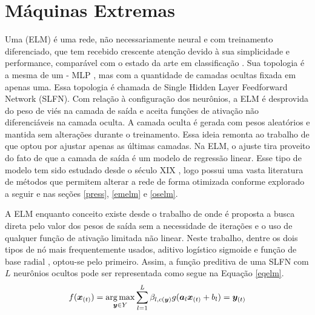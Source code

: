 \section{Máquinas Extremas}\label{elmorig}
Uma  (ELM) é uma rede, não
necessariamente neural e com treinamento diferenciado, que tem recebido crescente
atenção devido à sua simplicidade e performance, comparável com o estado da arte
em classificação \citep{journals/tsmc/HuangZDZ12}.
Sua topologia é a mesma de um  - MLP
\citep{haykin2004comprehensive}, mas com a quantidade de camadas ocultas fixada em apenas uma.
Essa topologia é chamada de 
{Single Hidden Layer Feedforward Network}
(SLFN).
Com relação à configuração dos neurônios, a ELM é desprovida do peso de viés na
camada de saída e aceita funções de ativação não diferenciáveis na camada oculta.
A camada oculta é gerada com pesos aleatórios e mantida sem alterações
durante o treinamento.
Essa ideia remonta ao trabalho de \cite{rosenblatt1961principles} que optou
por ajustar apenas as últimas camadas.
Na ELM, o ajuste tira proveito do fato de que a camada de saída
é um modelo de regressão linear.
Esse tipo de modelo tem sido estudado desde o século XIX \citep{legendre1805nouvelles},
logo possui uma vasta literatura de métodos que permitem alterar a rede de
forma otimizada conforme explorado a seguir e nas seções
\ref{press}, \ref{emelm} e \ref{oselm}.

A ELM enquanto conceito existe desde o trabalho de \cite{journals/tnn/HuangB98}
onde é proposta a busca direta pelo valor dos pesos de saída sem a necessidade de iterações
e o uso de qualquer função de ativação limitada não linear.
Neste trabalho, dentre os dois tipos de nó mais frequentemente usados,
aditivo logístico sigmoide e função de base radial \citep{journals/tsmc/HuangZDZ12},
optou-se pelo primeiro.
Assim, a função preditiva de uma SLFN com $L$ neurônios ocultos pode ser representada
como segue na Equação \ref{eqelm}.
\begin{equation} \label{eqelm}
f(\bm{x}_{(t)})= \operatorname*{arg\,max}_{\bm{y} \in Y}{\displaystyle\mathop{\sum} _{l=1}^{L}\beta_{l,c(\bm{y})}
g(\bm{a}_l \bm{x}_{(t)} + b_l)} = \bm{y}_{(t)}
\end{equation}

